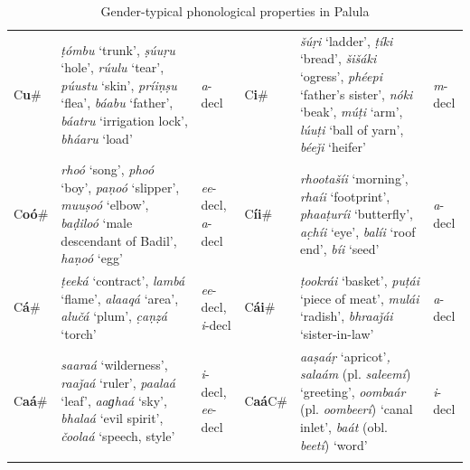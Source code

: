 \documentclass[output=collectionpaper]{langsci/langscibook}
\begin{document}
\begin{table}[t]
\begin{tabularx}{\textwidth}{p{1cm}>{\raggedright\let\newline\\\arraybackslash\hspace{0pt}}Xp{1cm}p{1cm}>{\raggedright\let\newline\\\arraybackslash\hspace{0pt}}Xp{1cm}}
\lsptoprule
\multicolumn{3}{X}{Masculine} & \multicolumn{3}{X}{Feminine}\\
\midrule
C\textbf{u}\# & \textit{ṭómbu} `trunk', \textit{ṣúuṛu} `hole', \textit{rúulu} `tear', \textit{púustu} `skin', \textit{príiṇṣu} `flea', \textit{báabu} `father', \textit{báatru} `irrigation lock', \textit{bháaru} `load' & \textit{a}{}-decl & C\textbf{i}\# & \textit{šúṛi} `ladder', \textit{ṭíki} `bread', \textit{šišáki} `ogress', \textit{phéepi} `father's sister', \textit{nóki} `beak', \textit{múṭi} `arm', \textit{lúuṭi} `ball of yarn', \textit{béeǰi} `heifer' & \textit{m}{}-decl\\
C\textbf{oó}\# & \textit{rhoó} `song', \textit{phoó} `boy', \textit{paṇoó} `slipper', \textit{muuṣoó} `elbow', \textit{baḍiloó} `male descendant of Badil', \textit{haṇoó} `egg' & \textit{ee}{}-decl, \textit{a}{}-decl & C\textbf{íi}\# & \textit{rhootašíi} `morning', \textit{rhaíi} `footprint', \textit{phaaṭuríi} `butterfly', \textit{ac̣híi} `eye', \textit{balíi} `roof end', \textit{bíi} `seed' & \textit{a}{}-decl\\
C\textbf{á}\# & \textit{ṭeeká} `contract', \textit{lambá} `flame', \textit{alaaqá} `area', \textit{alučá} `plum', \textit{c̣aṇẓá} `torch' & \textit{ee}{}-decl, \textit{i}{}-decl & C\textbf{á}\textbf{i}\# & \textit{ṭookrái} `basket', \textit{puṭái} `piece of meat', \textit{mulái} `radish', \textit{bhraaǰái} `sister-in-law' & \textit{a}{}-decl\\
C\textbf{aá}\# & \textit{saaraá} `wilderness', \textit{raaǰaá} `ruler', \textit{paalaá} `leaf', \textit{aaɡhaá} `sky', \textit{bhalaá} `evil spirit', \textit{čoolaá} `speech, style' & \textit{i}{}-decl, \textit{ee}{}-decl & C\textbf{aá}C\# & \textit{aaṣaáṛ} `apricot'\textit{, salaám} (pl. \textit{saleemí}) `greeting', \textit{oombaár} (pl. \textit{oombeerí}) `canal inlet', \textit{baát} (obl. \textit{beetí}) `word' & \textit{i}{}-decl\\
\lspbottomrule
\end{tabularx}
\caption{Gender-typical phonological properties in Palula}
\label{tab:Lilje:8}
\end{table}
\end{document}
